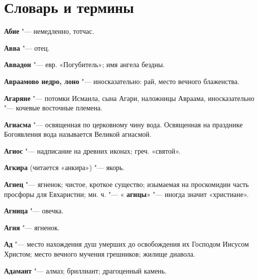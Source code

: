 \chapter{Словарь и термины}
 
\begin{mymulticols}{2}\footnotesize



\noindent\textbf{Абие} "--- немедленно, тотчас. 




\noindent\textbf{Авва} "--- отец. 




\noindent\textbf{Аввадон} "--- евр. «Погубитель»; имя ангела бездны. 




\noindent\textbf{Авраамово недро, лоно} "--- иносказательно: рай, место вечного блаженства. 




\noindent\textbf{Агаряне} "--- потомки Исмаила, сына Агари, наложницы Авраама, иносказательно "--- кочевые восточные племена. 




\noindent\textbf{Агиасма} "--- освященная по церковному чину вода. Освященная на празднике Богоявления вода называется Великой агиасмой. 




\noindent\textbf{Агиос} "--- надписание на древних иконах; греч. «святой». 




\noindent\textbf{Агкира} (читается «анкира») "--- якорь. 




\noindent\textbf{Агнец} "--- ягненок; чистое, кроткое существо; изымаемая на проскомидии часть просфоры для Евхаристии; мн. ч. "--- « \noindent\textbf{агнцы}» "--- иногда значит «христиане». 




\noindent\textbf{Агница} "--- овечка. 




\noindent\textbf{Агня} "--- ягненок. 




\noindent\textbf{Ад} "--- место нахождения душ умерших до освобождения их Господом Иисусом Христом; место вечного мучения грешников; жилище диавола. 




\noindent\textbf{Адамант} "--- алмаз; бриллиант; драгоценный камень. 





\end{mymulticols}
